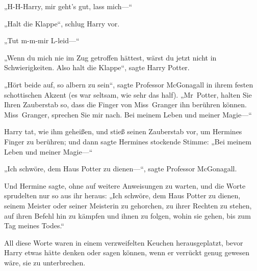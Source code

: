 „H-H-Harry, mir geht’s gut, lass mich—“

„Halt die Klappe“, schlug Harry vor.

„Tut m-m-mir L-leid—“

„Wenn du mich nie im Zug getroffen hättest, wärst du jetzt nicht in Schwierigkeiten. Also halt die Klappe“, sagte Harry Potter.

„Hört beide auf, so albern zu sein“, sagte Professor McGonagall in ihrem festen schottischen Akzent (es war seltsam, wie sehr das half).
„Mr~Potter, halten Sie Ihren Zauberstab so, dass die Finger von Miss~Granger ihn berühren können. Miss~Granger, sprechen Sie mir nach. Bei meinem Leben und meiner Magie—“

Harry tat, wie ihm geheißen, und stieß seinen Zauberstab vor, um Hermines Finger zu berühren; und dann sagte Hermines stockende Stimme:
„Bei meinem Leben und meiner Magie—“

„Ich schwöre, dem Haus Potter zu dienen—“, sagte Professor McGonagall.

Und Hermine sagte, ohne auf weitere Anweisungen zu warten, und die Worte sprudelten nur so aus ihr heraus:
„Ich schwöre, dem Haus Potter zu dienen, seinem Meister oder seiner Meisterin zu gehorchen, zu ihrer Rechten zu stehen, auf ihren Befehl hin zu kämpfen und ihnen zu folgen, wohin sie gehen, bis zum Tag meines Todes.“

All diese Worte waren in einem verzweifelten Keuchen herausgeplatzt, bevor Harry etwas hätte denken oder sagen können, wenn er verrückt genug gewesen wäre, sie zu unterbrechen.


